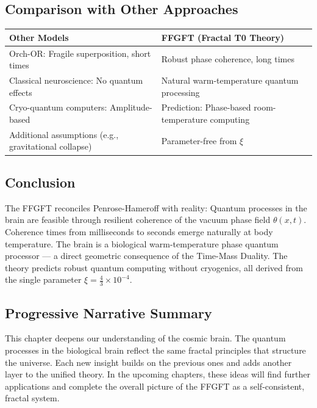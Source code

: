 	\subsection*{Comparison with Other Approaches}
	
	\begin{center}
		\begin{tabular}{p{}p{}}
			\textbf{Other Models} & \textbf{FFGFT (Fractal T0 Theory)} \\
			\hline
			Orch-OR: Fragile superposition, short times & Robust phase coherence, long times \\
			Classical neuroscience: No quantum effects & Natural warm-temperature quantum processing \\
			Cryo-quantum computers: Amplitude-based & Prediction: Phase-based room-temperature computing \\
			Additional assumptions (e.g., gravitational collapse) & Parameter-free from \(\xi\) \\
		\end{tabular}
	\end{center}
	
	\subsection*{Conclusion}
	
	The FFGFT reconciles Penrose-Hameroff with reality: Quantum processes in the brain are feasible through resilient coherence of the vacuum phase field \(\theta(x,t)\). Coherence times from milliseconds to seconds emerge naturally at body temperature. The brain is a biological warm-temperature phase quantum processor — a direct geometric consequence of the Time-Mass Duality. The theory predicts robust quantum computing without cryogenics, all derived from the single parameter \(\xi = \frac{4}{3} \times 10^{-4}\).
	
	\subsection*{Progressive Narrative Summary}
	
	This chapter deepens our understanding of the cosmic brain. The quantum processes in the biological brain reflect the same fractal principles that structure the universe. Each new insight builds on the previous ones and adds another layer to the unified theory. In the upcoming chapters, these ideas will find further applications and complete the overall picture of the FFGFT as a self-consistent, fractal system.



